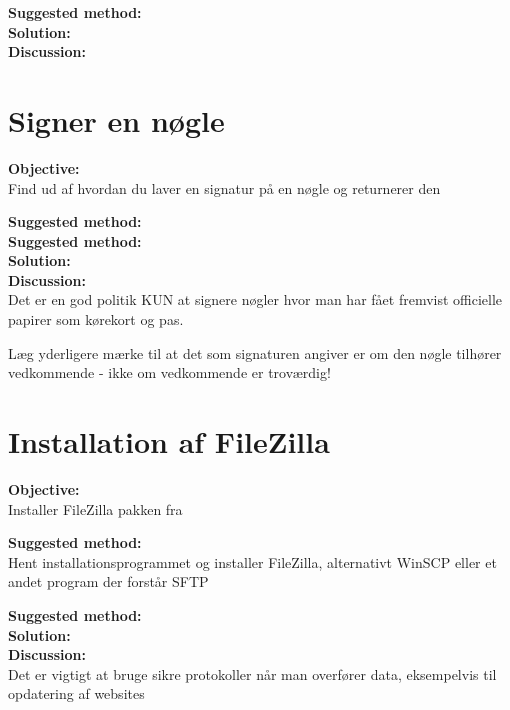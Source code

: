 \documentclass[a4paper,11pt,notitlepage]{report}
\begin{document}
{\bf Suggested method:}\\

{\bf Solution:}\\

{\bf Discussion:}\\




\chapter{Signer en nøgle}
\label{ex:pgp-sign-key}

{\bf Objective:}\\
Find ud af hvordan du laver en signatur på en nøgle og returnerer den

{\bf Suggested method:}\\


{\bf Suggested method:}\\

{\bf Solution:}\\

{\bf Discussion:}\\
Det er en god politik KUN at signere nøgler hvor man har fået fremvist
officielle papirer som kørekort og pas.

Læg yderligere mærke til at det som signaturen angiver er om den nøgle
tilhører vedkommende - ikke om vedkommende er troværdig!


\chapter{Installation af FileZilla}
\label{ex:filezilla}

{\bf Objective:}\\
Installer FileZilla pakken fra 

{\bf Suggested method:}\\
Hent installationsprogrammet og installer FileZilla, alternativt WinSCP eller et andet program der forstår SFTP

{\bf Suggested method:}\\

{\bf Solution:}\\

{\bf Discussion:}\\
Det er vigtigt at bruge sikre protokoller når man overfører data, eksempelvis til opdatering af websites







\appendix
\rhead{\fancyplain{}{\bfseries\leftmark}}


%



\end{document}
